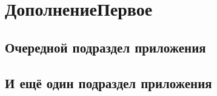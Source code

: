 %
\chapter{ДополнениеПервое} \label{AppendixA}%

\section{Очередной подраздел приложения} \label{AppendixA:1}%
%
\section{И ещё один подраздел приложения} \label{AppendixA:2}%
%
